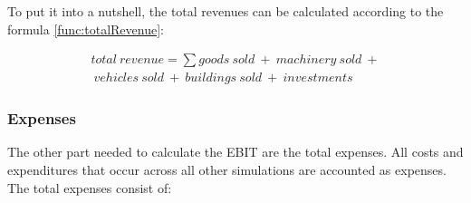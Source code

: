 To put it into a nutshell, the total revenues can be calculated according to the formula \ref{func:totalRevenue}:

\begin{equation}
\label{func:totalRevenue}
\begin{split}
    total \ revenue = \sum goods \ sold \ + \ machinery \ sold \ + \\\ vehicles \ sold \  + \ buildings \ sold \ + \ investments   
\end{split}
\end{equation}

\subsubsection{Expenses}
The other part needed to calculate the EBIT are the total expenses. All costs and expenditures that occur across all other simulations are accounted as expenses. The total expenses consist of:
